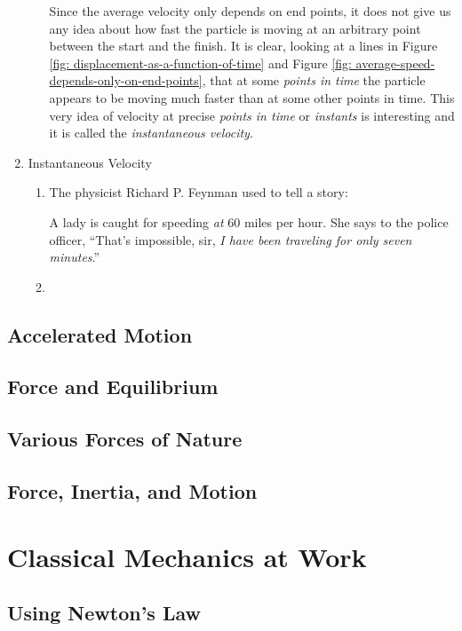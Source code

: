 \documentclass[12pt,a4paper]{book}
\begin{document}
\begin{enumerate}
\begin{enumerate}
                Since the average velocity only depends on end points, it does not give us any idea about how fast the particle is moving at an arbitrary point between the start and the finish. It is clear, looking at a lines in Figure \ref{fig: displacement-as-a-function-of-time} and Figure \ref{fig: average-speed-depends-only-on-end-points}, that at some \emph{points in time} the particle appears to be moving much faster than at some other points in time. This very idea of velocity at precise \emph{points in time} or \emph{instants} is interesting and it is called the \emph{instantaneous velocity}.
        \end{enumerate}
    \item Instantaneous Velocity
        \begin{enumerate}
            \item The physicist Richard P. Feynman used to tell a story:

                A lady is caught for speeding \emph{at} 60 miles per hour. She says to the police officer, ``That's impossible, sir, \emph{I have been traveling for only seven minutes}.''

            \item 
        \end{enumerate}

\end{enumerate}

\chapter{Accelerated Motion} \label{ch: 3-accelerated-motion}
\chapter{Force and Equilibrium} \label{ch: 4-force-equilibrium}
\chapter{Various Forces of Nature} \label{ch: 5-forces-of-nature}
\chapter{Force, Inertia, and Motion} \label{ch: 6-force-inertia-motion}
\part{Classical Mechanics at Work}
\chapter{Using Newton's Law} \label{ch: 7-newtons-law}
\end{document}
